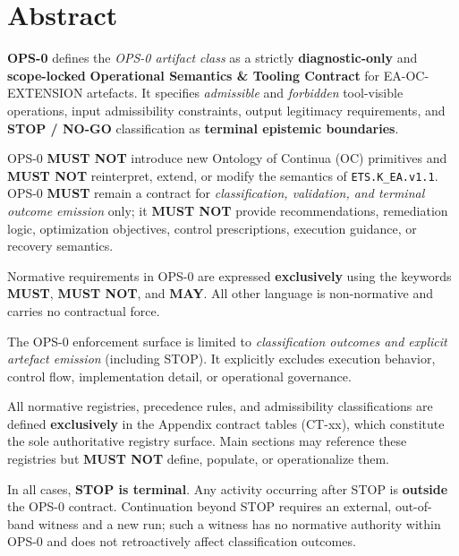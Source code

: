 ﻿\section*{Abstract}

\textbf{OPS-0} defines the \emph{OPS-0 artifact class} as a strictly \textbf{diagnostic-only} and \textbf{scope-locked} \textbf{Operational Semantics \& Tooling Contract} for EA-OC-EXTENSION artefacts.
It specifies \emph{admissible} and \emph{forbidden} tool-visible operations, input admissibility constraints, output legitimacy requirements, and \textbf{STOP / NO-GO} classification as \textbf{terminal epistemic boundaries}.

OPS-0 \textbf{MUST NOT} introduce new Ontology of Continua (OC) primitives and \textbf{MUST NOT} reinterpret, extend, or modify the semantics of \texttt{ETS.K\_EA.v1.1}.
OPS-0 \textbf{MUST} remain a contract for \emph{classification, validation, and terminal outcome emission} only; it \textbf{MUST NOT} provide recommendations, remediation logic, optimization objectives, control prescriptions, execution guidance, or recovery semantics.

Normative requirements in OPS-0 are expressed \textbf{exclusively} using the keywords \textbf{MUST}, \textbf{MUST NOT}, and \textbf{MAY}.
All other language is non-normative and carries no contractual force.

The OPS-0 enforcement surface is limited to \emph{classification outcomes and explicit artefact emission} (including STOP).
It explicitly excludes execution behavior, control flow, implementation detail, or operational governance.

All normative registries, precedence rules, and admissibility classifications are defined \textbf{exclusively} in the Appendix contract tables (CT-xx), which constitute the sole authoritative registry surface.
Main sections may reference these registries but \textbf{MUST NOT} define, populate, or operationalize them.

In all cases, \textbf{STOP is terminal}.
Any activity occurring after STOP is \textbf{outside} the OPS-0 contract.
Continuation beyond STOP requires an external, out-of-band witness and a new run; such a witness has no normative authority within OPS-0 and does not retroactively affect classification outcomes.

